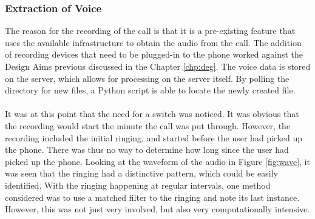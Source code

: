\documentclass[main.tex]{subfiles}
\begin{document}
\subsubsection{Extraction of Voice}
The reason for the recording of the call is that it is a pre-existing feature that uses the available infrastructure to obtain the audio from the call. The addition of recording devices that need to be plugged-in to the phone worked against the Design Aims previous discussed in the Chapter \ref{chp:deg}. The voice data is stored on the server, which allows for processing on the server itself. By polling the directory for new files, a Python script is able to locate the newly created file.
\\\\
It was at this point that the need for a switch was noticed. It was obvious that the recording would start the minute the call was put through. However, the recording included the initial ringing, and started before the user had picked up the phone. There was thus no way to determine how long since the user had picked up the phone. Looking at the waveform of the audio in Figure \ref{fig:wave}, it was seen that the ringing had a distinctive pattern, which could be easily identified. With the ringing happening at regular intervals, one method considered was to use a matched filter to the ringing and note its last instance. However, this was not just very involved, but also very computationally intensive.
\end{document}
